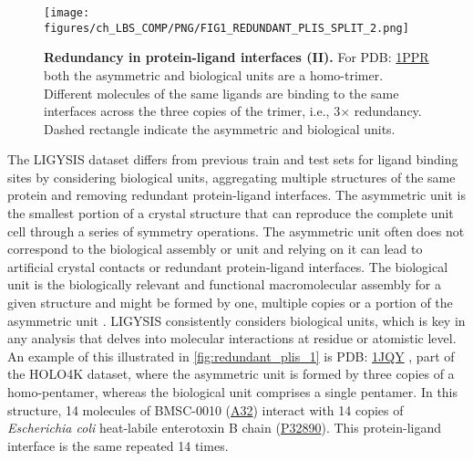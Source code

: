 \begin{figure}[htb!]
    \centering
    \texttt{[image: figures/ch\_LBS\_COMP/PNG/FIG1\_REDUNDANT\_PLIS\_SPLIT\_2.png]}
    \caption[Redundancy in protein-ligand interfaces (II)]{\textbf{Redundancy in protein-ligand interfaces (II).} For PDB: \href{https://www.ebi.ac.uk/pdbe/entry/pdb/1PPR}{1PPR} both the asymmetric and biological units are a homo-trimer. Different molecules of the same ligands are binding to the same interfaces across the three copies of the trimer, i.e., 3$\times$ redundancy. Dashed rectangle indicate the asymmetric and biological units.}
    \label{fig:redundant_plis_2}
\end{figure}

The LIGYSIS dataset differs from previous train and test sets for ligand binding sites by considering biological units, aggregating multiple structures of the same protein and removing redundant protein-ligand interfaces. The asymmetric unit is the smallest portion of a crystal structure that can reproduce the complete unit cell through a series of symmetry operations. The asymmetric unit often does not correspond to the biological assembly or unit and relying on it can lead to artificial crystal contacts or redundant protein-ligand interfaces. The biological unit is the biologically relevant and functional macromolecular assembly for a given structure and might be formed by one, multiple copies or a portion of the asymmetric unit \cite{XU_2019_ASSEMBLIES}. LIGYSIS consistently considers biological units, which is key in any analysis that delves into molecular interactions at residue or atomistic level. An example of this illustrated in \autoref{fig:redundant_plis_1} is PDB: \href{https://www.ebi.ac.uk/pdbe/entry/pdb/1jqy}{1JQY} \cite{PICKENS_2002_ANCHOR}, part of the HOLO4K dataset, where the asymmetric unit is formed by three copies of a homo-pentamer, whereas the biological unit comprises a single pentamer. In this structure, 14 molecules of BMSC-0010 (\href{https://www.rcsb.org/ligand/A32}{A32}) interact with 14 copies of \textit{Escherichia coli} heat-labile enterotoxin B chain (\href{https://www.uniprot.org/uniprotkb/P32890/entry}{P32890}). This protein-ligand interface is the same repeated 14 times.


